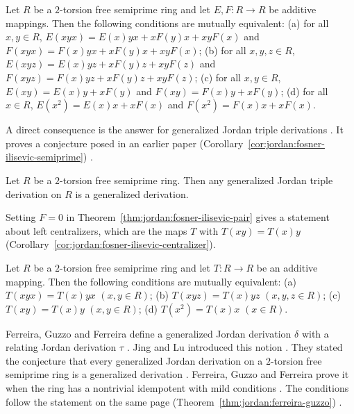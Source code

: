 \begin{theorem}\label{thm:jordan:fosner-ilisevic-pair}
Let $R$ be a $2$-torsion free semiprime ring and let $E,F\colon R\to R$ be additive mappings.
Then the following conditions are mutually equivalent:
(a) for all $x,y\in R$, $E(xyx)=E(x)yx+xF(y)x+xyF(x)$ and $F(xyx)=F(x)yx+xF(y)x+xyF(x)$;
(b) for all $x,y,z\in R$, $E(xyz)=E(x)yz+xF(y)z+xyF(z)$ and $F(xyz)=F(x)yz+xF(y)z+xyF(z)$;
(c) for all $x,y\in R$, $E(xy)=E(x)y+xF(y)$ and $F(xy)=F(x)y+xF(y)$;
(d) for all $x\in R$, $E(x^{2})=E(x)x+xF(x)$ and $F(x^{2})=F(x)x+xF(x)$.
\end{theorem}

A direct consequence is the answer for generalized Jordan triple derivations
\cite[p.~424]{FosnerIlisevic2008}. It proves a conjecture posed in an earlier paper (Corollary~\ref{cor:jordan:fosner-ilisevic-semiprime})
\cite[p.~424]{FosnerIlisevic2008}.\begin{corollary}\label{cor:jordan:fosner-ilisevic-semiprime}
Let $R$ be a $2$-torsion free semiprime ring. Then any generalized Jordan triple derivation on $R$
is a generalized derivation.
\end{corollary}

Setting $F=0$ in Theorem~\ref{thm:jordan:fosner-ilisevic-pair} gives a
statement about left centralizers, which are the maps $T$ with $T(xy)=T(x)y$
\cite[p.~424]{FosnerIlisevic2008}
(Corollary~\ref{cor:jordan:fosner-ilisevic-centralizer}).

\begin{corollary}\label{cor:jordan:fosner-ilisevic-centralizer}
Let $R$ be a $2$-torsion free semiprime ring and let $T\colon R\to R$ be an additive mapping.
Then the following conditions are mutually equivalent:
(a) $T(xyx)=T(x)yx$ $(x,y\in R)$;
(b) $T(xyz)=T(x)yz$ $(x,y,z\in R)$;
(c) $T(xy)=T(x)y$ $(x,y\in R)$;
(d) $T(x^{2})=T(x)x$ $(x\in R)$.
\end{corollary}

Ferreira, Guzzo and Ferreira define a generalized Jordan derivation $\delta$
with a relating Jordan derivation $\tau$
\cite[p.~1]{FerreiraGuzzoFerreira2020}. Jing and Lu introduced this notion
\cite[p.~2]{FerreiraGuzzoFerreira2020}. They stated the conjecture that every
generalized Jordan derivation on a $2$-torsion free semiprime ring is a
generalized derivation \cite[p.~2]{FerreiraGuzzoFerreira2020}. Ferreira, Guzzo
and Ferreira prove it when the ring has a nontrivial idempotent with mild
conditions \cite[p.~2]{FerreiraGuzzoFerreira2020}. The conditions follow the
statement on the same page (Theorem~\ref{thm:jordan:ferreira-guzzo})
\cite[p.~2]{FerreiraGuzzoFerreira2020}.

